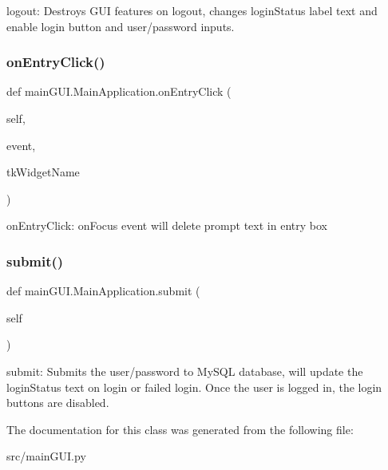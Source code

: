 \begin{DoxyVerb}logout: Destroys GUI features on logout, changes loginStatus label
    text and enable login button and user/password inputs. \end{DoxyVerb}
 \hypertarget{classmain_g_u_i_1_1_main_application_a8389dd29b6914c6e878435ba3176f2af}{}\label{classmain_g_u_i_1_1_main_application_a8389dd29b6914c6e878435ba3176f2af} 
\subsubsection{\texorpdfstring{on\+Entry\+Click()}{onEntryClick()}}
{\footnotesize\ttfamily def main\+G\+U\+I.\+Main\+Application.\+on\+Entry\+Click (\begin{DoxyParamCaption}\item[{}]{self,  }\item[{}]{event,  }\item[{}]{tk\+Widget\+Name }\end{DoxyParamCaption})}

\begin{DoxyVerb}onEntryClick: onFocus event will delete prompt text in entry box \end{DoxyVerb}
 \hypertarget{classmain_g_u_i_1_1_main_application_a828c13a008e6029d6f9aac3d3f6189fd}{}\label{classmain_g_u_i_1_1_main_application_a828c13a008e6029d6f9aac3d3f6189fd} 
\subsubsection{\texorpdfstring{submit()}{submit()}}
{\footnotesize\ttfamily def main\+G\+U\+I.\+Main\+Application.\+submit (\begin{DoxyParamCaption}\item[{}]{self }\end{DoxyParamCaption})}

\begin{DoxyVerb}submit: Submits the user/password to MySQL database, will update
    the loginStatus text on login or failed login. Once the user is
    logged in, the login buttons are disabled. \end{DoxyVerb}
 

The documentation for this class was generated from the following file\+:\begin{DoxyCompactItemize}
\item 
src/main\+G\+U\+I.\+py\end{DoxyCompactItemize}
